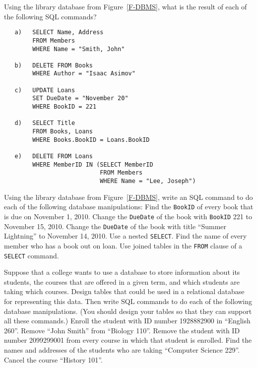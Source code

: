 \begin{exercises}

\problem Using the library database from Figure~\ref{F-DBMS},
what is the result of each of the following SQL commands?
\begin{verbatim}
   a)   SELECT Name, Address
        FROM Members
        WHERE Name = "Smith, John"
        
   b)   DELETE FROM Books
        WHERE Author = "Isaac Asimov"

   c)   UPDATE Loans
        SET DueDate = "November 20"
        WHERE BookID = 221

   d)   SELECT Title
        FROM Books, Loans
        WHERE Books.BookID = Loans.BookID
        
   e)   DELETE FROM Loans
        WHERE MemberID IN (SELECT MemberID
                           FROM Members
                           WHERE Name = "Lee, Joseph")
\end{verbatim}

\problem Using the library database from Figure~\ref{F-DBMS},
write an SQL command to do each of the following database
manipulations:
\ppart Find the \texttt{BookID} of every book that is due on
November 1, 2010.
\ppart Change the \texttt{DueDate} of the book with \texttt{BookID} 221
to November 15, 2010.
\ppart Change the \texttt{DueDate} of the book with title
``Summer Lightning'' to November 14, 2010.  Use a nested
\texttt{SELECT}.
\ppart Find the name of every member who has a book out on loan.
Use joined tables in the \texttt{FROM} clause of a \texttt{SELECT}
command.

\problem Suppose that a college wants to use a database to store
information about its students, the courses that are offered in
a given term, and which students are taking which courses.
Design tables that could be used in a relational
database for representing this data.  Then
write SQL commands to do each of the following database
manipulations.  (You should design your tables so that they
can support all these commands.)
\ppart Enroll the student with ID number 1928882900 in ``English 260''.
\ppart Remove ``John Smith'' from ``Biology 110''.
\ppart Remove the student with ID number 2099299001 from every course
in which that student is enrolled.
\ppart Find the names and addresses of the students who are taking ``Computer Science 229''.
\ppart Cancel the course ``History 101''.


\end{exercises}


\endinput

